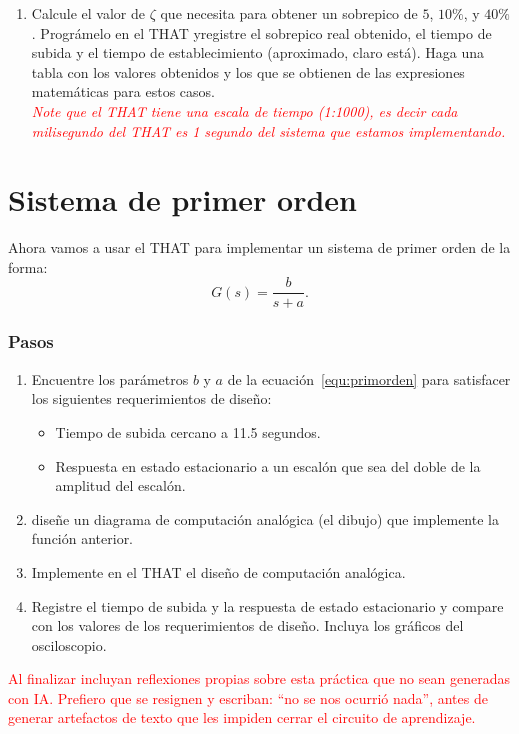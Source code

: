 \documentclass[]{scrartcl}
\begin{document}
\begin{enumerate}[label=\alph*)]
\begin{enumerate}
	
	
	\item \textcolor{bitacora}{Calcule el valor de $\zeta$ que necesita para obtener un sobrepico de $5$, $10\%$, y $40\%$. Prográmelo en el THAT  yregistre  el sobrepico real obtenido, el tiempo de subida y el tiempo de establecimiento (aproximado, claro está). Haga una tabla con los valores obtenidos y los que se obtienen de las expresiones matemáticas para estos casos.}  \\
	

	
	\textcolor{red}{\emph{Note que el THAT tiene una escala de tiempo (1:1000), es decir cada milisegundo del THAT es 1 segundo del sistema que estamos implementando.}}
\end{enumerate}

\section{Sistema de primer orden} 

Ahora vamos a usar el THAT para implementar un sistema de primer orden de la forma: 
\begin{equation}
 G(s)=\dfrac{b}{s+a}.
 \label{equ:primorden}
 \end{equation}
 
\subsubsection*{Pasos}

\begin{enumerate}
	
	\item  \textcolor{bitacora}{Encuentre los parámetros $b$ y $a$ de la ecuación~\ref{equ:primorden} para satisfacer los siguientes requerimientos de diseño:}
	\begin{itemize}
		\item Tiempo de subida cercano a 11.5 segundos.
		\item Respuesta en estado estacionario a un escalón que sea del doble de la amplitud del escalón.
	\end{itemize}
	
	\item \textcolor{bitacora}{diseñe un diagrama de computación analógica (el dibujo) que implemente la función anterior.}
	
	\item Implemente en el THAT el diseño de computación analógica.
	
	\item  \textcolor{bitacora}{Registre el tiempo de subida y la respuesta de estado estacionario y compare con los valores de los requerimientos de diseño. Incluya los gráficos del osciloscopio.}
	

\end{enumerate} 
\end{enumerate}

\textcolor{red}{\Large Al finalizar incluyan reflexiones propias sobre esta práctica que no sean generadas con IA. Prefiero que se resignen y escriban: ``no se nos ocurrió nada'', antes de generar artefactos de texto que les impiden  cerrar el circuito de aprendizaje.}
\end{document}

